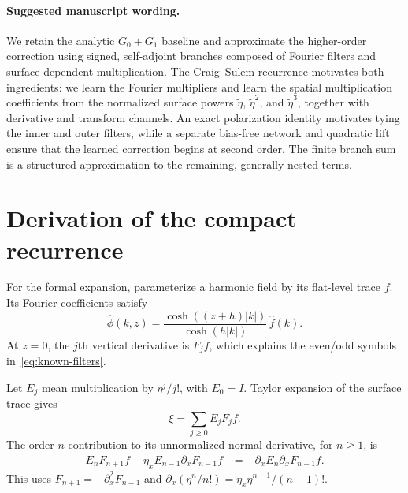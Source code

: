 \documentclass[11pt,letterpaper]{article}
\begin{document}
\paragraph{Suggested manuscript wording.}
We retain the analytic $G_0+G_1$ baseline and approximate the higher-order
correction using signed, self-adjoint branches composed of Fourier filters
and surface-dependent multiplication. The Craig--Sulem recurrence motivates
both ingredients: we learn the Fourier multipliers and learn the spatial
multiplication coefficients from the normalized surface powers
$\widetilde\eta$, $\widetilde\eta^2$, and $\widetilde\eta^3$, together with
derivative and transform channels. An exact polarization identity motivates
tying the inner and outer filters, while a separate bias-free network and
quadratic lift ensure that the learned correction begins at second order.
The finite branch sum is a structured approximation to the remaining,
generally nested terms.

\clearpage
\appendix
\section{Derivation of the compact recurrence}
\label{sec:derivation}

For the formal expansion, parameterize a harmonic field by its flat-level
trace $f$. Its Fourier coefficients satisfy
\begin{equation}
  \widehat\phi(k,z)
    =\frac{\cosh((z+h)|k|)}{\cosh(h|k|)}\,\widehat f(k).
\end{equation}
At $z=0$, the $j$th vertical derivative is $F_j f$, which explains the
even/odd symbols in~\eqref{eq:known-filters}.

Let $E_j$ mean multiplication by $\eta^j/j!$, with $E_0=I$. Taylor expansion
of the surface trace gives
\begin{equation}
  \xi=\sum_{j\geq0}E_j F_j f.
\end{equation}
The order-$n$ contribution to its unnormalized normal derivative, for
$n\geq1$, is
\begin{align}
  E_n F_{n+1}f-\eta_x E_{n-1}\partial_x F_{n-1}f
    &=-\partial_x E_n\partial_x F_{n-1}f.
\end{align}
This uses $F_{n+1}=-\partial_x^2 F_{n-1}$ and
$\partial_x(\eta^n/n!)=\eta_x\eta^{n-1}/(n-1)!$.
\end{document}
